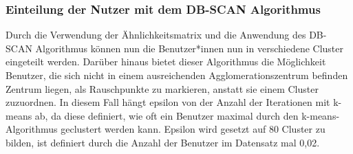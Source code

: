 \subsubsection{Einteilung der Nutzer mit dem DB-SCAN Algorithmus}
Durch die Verwendung der Ähnlichkeitsmatrix und die Anwendung des DB-SCAN
Algorithmus können nun die Benutzer*innen nun in verschiedene Cluster eingeteilt werden.
Darüber hinaus bietet dieser Algorithmus die Möglichkeit
Benutzer, die sich nicht in einem ausreichenden Agglomerationszentrum befinden
Zentrum liegen, als Rauschpunkte zu markieren, anstatt sie einem Cluster zuzuordnen.
In diesem Fall hängt epsilon von der Anzahl der Iterationen mit
k-means ab, da diese definiert, wie oft ein Benutzer maximal
durch den k-means-Algorithmus geclustert werden kann. Epsilon wird gesetzt auf
80 %
Cluster zu bilden, ist definiert durch die Anzahl der Benutzer im Datensatz
mal 0,02.

